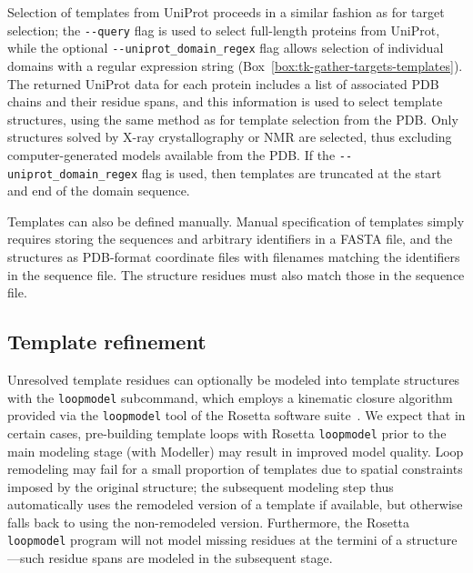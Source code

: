 \documentclass[aps,pre,twocolumn,nofootinbib,superscriptaddress,linenumbers]{revtex4-1}
\begin{document}
Selection of templates from UniProt proceeds in a similar fashion as for target selection; the {\tt -{}-query} flag is used to select full-length proteins from UniProt, while the optional {\tt -{}-uniprot\_domain\_regex} flag allows selection of individual domains with a regular expression string (Box~\ref{box:tk-gather-targets-templates}).
The returned UniProt data for each protein includes a list of associated PDB chains and their residue spans, and this information is used to select template structures, using the same method as for template selection from the PDB.
Only structures solved by X-ray crystallography or NMR are selected, thus excluding computer-generated models available from the PDB.
If the {\tt -{}-uniprot\_domain\_regex} flag is used, then templates are truncated at the start and end of the domain sequence.

Templates can also be defined manually.
Manual specification of templates simply requires storing the sequences and arbitrary identifiers in a FASTA file, and the structures as PDB-format coordinate files with filenames matching the identifiers in the sequence file.
The structure residues must also match those in the sequence file.

\subsection{Template refinement}

Unresolved template residues can optionally be modeled into template structures with the {\tt loopmodel} subcommand, which employs a kinematic closure algorithm provided via the {\tt loopmodel} tool of the Rosetta software suite~\cite{qian:nature:2007:modeller,wang:jmb:2007:modeller}.
We expect that in certain cases, pre-building template loops with Rosetta {\tt loopmodel} prior to the main modeling stage (with Modeller) may result in improved model quality.
Loop remodeling may fail for a small proportion of templates due to spatial constraints imposed by the original structure; the subsequent modeling step thus automatically uses the remodeled version of a template if available, but otherwise falls back to using the non-remodeled version.
Furthermore, the Rosetta {\tt loopmodel} program will not model missing residues at the termini of a structure---such residue spans are modeled in the subsequent stage.
\end{document}
